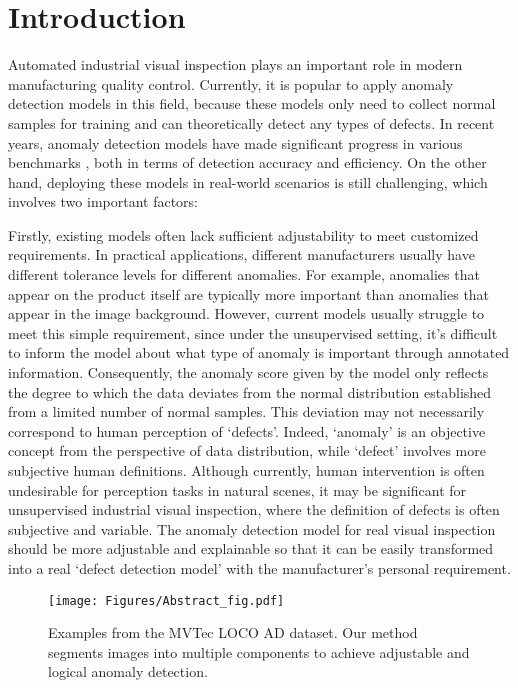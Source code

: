 \documentclass[final,5p,times,twocolumn]{elsarticle}
\begin{document}
\section{Introduction}
\label{}
Automated industrial visual inspection plays an important role in modern manufacturing quality control. Currently, it is popular to apply anomaly detection models in this field, because these models only need to collect normal samples for training and can theoretically detect any types of defects. In recent years, anomaly detection models have made significant progress \cite{roth2022towards,rudolph2023asymmetric, horwitz2022back, wang2023multimodal} in various benchmarks \cite{liu2023deep,xie2023iad}, both in terms of detection accuracy and efficiency. On the other hand, deploying these models in real-world scenarios is still challenging, which involves two important factors:

Firstly, existing models often lack sufficient adjustability to meet customized requirements. In practical applications, different manufacturers usually have different tolerance levels for different anomalies. For example, anomalies that appear on the product itself are typically more important than anomalies that appear in the image background. However, current models usually struggle to meet this simple requirement, since under the unsupervised setting,  it's difficult to inform the model about what type of anomaly is important through annotated information. Consequently, the anomaly score given by the model only reflects the degree to which the data deviates from the normal distribution established from a limited number of normal samples. This deviation may not necessarily correspond to human perception of `defects'. Indeed, `anomaly' is an objective concept from the perspective of data distribution, while `defect' involves more subjective human definitions. Although currently, human intervention is often undesirable for perception tasks in natural scenes, it may be significant for unsupervised industrial visual inspection, where the definition of defects is often subjective and variable. The anomaly detection model for real visual inspection should be more adjustable and explainable so that it can be easily transformed into a real `defect detection model' with the manufacturer's personal requirement.

\begin{figure}[t]
\centering
		\texttt{[image: Figures/Abstract\_fig.pdf]}\caption{Examples from the MVTec LOCO AD dataset. Our method segments images into multiple components to achieve adjustable and logical anomaly detection.}
	\label{FIG:1}
\end{figure}
\end{document}
